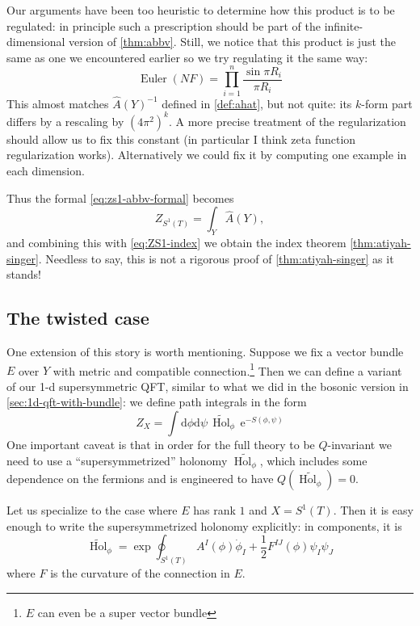 \documentclass[12pt,letterpaper,reqno]{article}
\numberwithin{equation}{section}
\newcommand{\half}{\ensuremath{\frac{1}{2}}}
\newcommand{\e}{{\mathrm e}}
\newcommand{\de}{\mathrm{d}}
\DeclareMathOperator{\Hol}{Hol}
\DeclareMathOperator{\Euler}{Euler}
\newcommand{\fixme}[1]{{\color{orange}{[#1]}}}
\begin{document}
Our arguments have been too heuristic to determine how this product is to be regulated:
in principle such a prescription should be part of the infinite-dimensional 
version of \autoref{thm:abbv}.
Still, we notice that this product is just the same as one we encountered earlier \fixme{...}
so we try regulating it the same way:
\begin{equation}
  \Euler(NF) = \prod_{i=1}^n \frac{\sin \pi R_i}{\pi R_i}
\end{equation}
This almost matches $\hat A(Y)^{-1}$ defined in \autoref{def:ahat}, 
but not quite: its $k$-form part 
differs by a rescaling by $(4 \pi^2)^k$.
A more precise treatment of the regularization should allow us to
fix this constant (in particular I think zeta function regularization works).
Alternatively we could fix it by computing one example in each dimension.

Thus the formal \eqref{eq:zs1-abbv-formal} becomes
\begin{equation}
  Z_{S^1(T)} = \int_Y \hat A(Y),
\end{equation}
and combining this with \eqref{eq:ZS1-index}
we obtain the index theorem \autoref{thm:atiyah-singer}.
Needless to say, this is not a rigorous proof of \autoref{thm:atiyah-singer}
as it stands!

\fixme{refs: Witten, Alvarez-Gaume, Atiyah}

\subsection{The twisted case}

\fixme{ref: Friedan-Windey}

One extension of this story is worth mentioning.
Suppose we fix a vector bundle $E$ over $Y$
with metric and compatible connection.\footnote{$E$ can even be a super vector bundle
\fixme{...}}
Then we can define a variant of our 1-d supersymmetric QFT,
similar to what we did in the bosonic version in \autoref{sec:1d-qft-with-bundle}:
we define path integrals in the form
\begin{equation}
  Z_X = \int \de \phi \de \psi \, \widetilde{\Hol}_\phi \, \e^{-S(\phi,\psi)}
\end{equation}
One important caveat is that in order for the full theory to be $Q$-invariant
we need to use a ``supersymmetrized'' holonomy $\widetilde{\Hol_\phi}$, which includes
some dependence on the fermions and is engineered to have $Q (\widetilde{\Hol_\phi}) = 0$.

Let us specialize to the case where $E$ has rank $1$ and $X = S^1(T)$.
Then it is easy enough to write the supersymmetrized
holonomy explicitly: in components, it is
\begin{equation} \label{eq:super-hol}
  \widetilde{\Hol}_\phi = \exp \oint_{S^1(T)} A^I(\phi) \dot \phi_I + \half F^{IJ}(\phi) \psi_I \psi_J
\end{equation}
where $F$ is the curvature of the connection in $E$.
\end{document}
